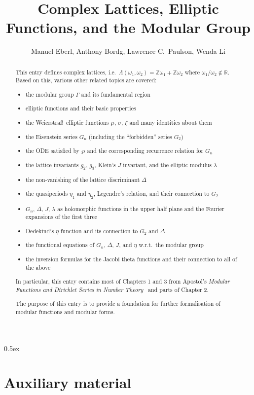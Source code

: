 \documentclass[11pt,a4paper]{article}
\begin{document}
\title{Complex Lattices, Elliptic Functions, and the Modular Group}
\author{Manuel Eberl, Anthony Bordg, Lawrence C.\ Paulson, Wenda Li}
\maketitle

\begin{abstract}
This entry defines complex lattices, i.e.\ $\Lambda(\omega_1,\omega_2) = \mathbb{Z}\omega_1 + \mathbb{Z}\omega_2$ where $\omega_1/\omega_2\notin\mathbb{R}$.
Based on this, various other related topics are covered:
\begin{itemize}
\item the modular group $\Gamma$ and its fundamental region
\item elliptic functions and their basic properties
\item the Weierstra\ss\ elliptic functions $\wp$, $\sigma$, $\zeta$ and many identities about them
\item the Eisenstein series $G_n$ (including the ``forbidden'' series $G_2$)
\item the ODE satisfied by $\wp$ and the corresponding recurrence relation for $G_n$
\item the lattice invariants $g_2$, $g_3$, Klein's $J$ invariant, and the elliptic modulus $\lambda$
\item the non-vanishing of the lattice discriminant $\Delta$
\item the quasiperiods $\eta_1$ and $\eta_2$, Legendre's relation, and their connection to $G_2$
\item $G_n$, $\Delta$, $J$, $\lambda$ as holomorphic functions in the upper half plane and the Fourier expansions of the first three
\item Dedekind's $\eta$ function and its connection to $G_2$ and $\Delta$
\item the functional equations of $G_n$, $\Delta$, $J$, and $\eta$ w.r.t.\ the modular group
\item the inversion formulas for the Jacobi theta functions and their connection to all of the above
\end{itemize}
In particular, this entry contains most of Chapters 1 and 3 from Apostol's
\emph{Modular Functions and Dirichlet Series in Number Theory}~\cite{apostol} and parts of Chapter 2.

The purpose of this entry is to provide a foundation for further formalisation of
modular functions and modular forms.
\end{abstract}

\newpage

\tableofcontents

\newpage
\parindent 0pt\parskip 0.5ex

\section{Auxiliary material}



\raggedright
\nocite{brent2020}
\nocite{borwein1987}



\end{document}
